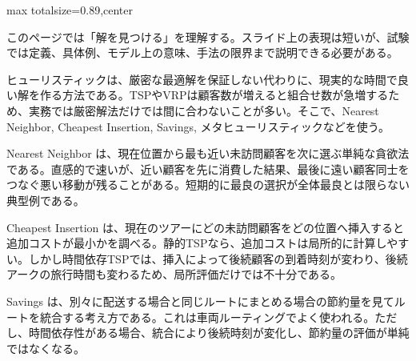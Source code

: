 \begin{minipage}[t]{0.58\textwidth}
\begin{adjustbox}{max totalsize={\textwidth}{0.89\textheight},center}
\begin{minipage}{\textwidth}\scriptsize
{}このページでは「解を見つける」を理解する。スライド上の表現は短いが、試験では定義、具体例、モデル上の意味、手法の限界まで説明できる必要がある。\par
ヒューリスティックは、厳密な最適解を保証しない代わりに、現実的な時間で良い解を作る方法である。TSPやVRPは顧客数が増えると組合せ数が急増するため、実務では厳密解法だけでは間に合わないことが多い。そこで、Nearest Neighbor, Cheapest Insertion, Savings, メタヒューリスティックなどを使う。\par
Nearest Neighbor は、現在位置から最も近い未訪問顧客を次に選ぶ単純な貪欲法である。直感的で速いが、近い顧客を先に消費した結果、最後に遠い顧客同士をつなぐ悪い移動が残ることがある。短期的に最良の選択が全体最良とは限らない典型例である。\par
Cheapest Insertion は、現在のツアーにどの未訪問顧客をどの位置へ挿入すると追加コストが最小かを調べる。静的TSPなら、追加コストは局所的に計算しやすい。しかし時間依存TSPでは、挿入によって後続顧客の到着時刻が変わり、後続アークの旅行時間も変わるため、局所評価だけでは不十分である。\par
Savings は、別々に配送する場合と同じルートにまとめる場合の節約量を見てルートを統合する考え方である。これは車両ルーティングでよく使われる。ただし、時間依存性がある場合、統合により後続時刻が変化し、節約量の評価が単純ではなくなる。\par

\end{minipage}
\end{adjustbox}
\end{minipage}
